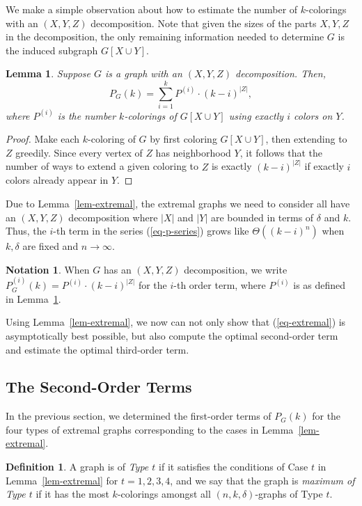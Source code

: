 \documentclass[11pt]{article}
\theoremstyle{plain}
\newtheorem{lemma}[theorem]{Lemma}
\theoremstyle{definition}
\newtheorem{definition}[theorem]{Definition}
\newtheorem*{notation}{Notation}
\theoremstyle{remark}
\begin{document}
We make a simple observation about how to estimate the number of $k$-colorings with an $(X,Y,Z)$ decomposition. Note that given the sizes of the parts $X,Y,Z$ in the decomposition, the only remaining information needed to determine $G$ is the induced subgraph $G[X \cup Y]$.

\begin{lemma}\label{lem-p-series}
Suppose $G$ is a graph with an $(X,Y,Z)$ decomposition. Then,
\begin{equation}\label{eq-p-series}
P_G(k) = \sum_{i=1}^{k} P^{(i)} \cdot (k-i)^{|Z|},
\end{equation}
where $P^{(i)}$ is the number $k$-colorings of $G[X\cup Y]$ using exactly $i$ colors on $Y$.
\end{lemma}
\begin{proof}
Make each $k$-coloring of $G$ by first coloring $G[X\cup Y]$, then extending to $Z$ greedily. Since every vertex of $Z$ has neighborhood $Y$, it follows that the number of ways to extend a given coloring to $Z$ is exactly $(k-i)^{|Z|}$ if exactly $i$ colors already appear in $Y$.
\end{proof}

Due to Lemma~\ref{lem-extremal}, the extremal graphs we need to consider all have an $(X,Y,Z)$ decomposition where $|X|$ and $|Y|$ are bounded in terms of $\delta$ and $k$. Thus, the $i$-th term in the series (\ref{eq-p-series}) grows like $\Theta((k-i)^n)$ when $k,\delta$ are fixed and $n\rightarrow \infty$. 

\begin{notation}
When $G$ has an $(X,Y,Z)$ decomposition, we write $P_G^{(i)}(k)=P^{(i)}\cdot (k-i)^{|Z|}$ for the $i$-th order term, where $P^{(i)}$ is as defined in Lemma~\ref{lem-p-series}.
\end{notation}

Using Lemma~\ref{lem-extremal}, we now can not only show that (\ref{eq-extremal}) is asymptotically best possible, but also compute the optimal second-order term and estimate the optimal third-order term. 


\subsection{The Second-Order Terms}
In the previous section, we determined the first-order terms of $P_G(k)$ for the four types of extremal graphs corresponding to the cases in Lemma~\ref{lem-extremal}.

\begin{definition}
A graph is of {\em Type $t$} if it satisfies the conditions of Case $t$ in Lemma~\ref{lem-extremal} for $t=1,2,3,4$, and we say that the graph is {\em maximum of Type $t$} if it has the most $k$-colorings amongst all $(n,k,\delta)$-graphs of Type $t$.
\end{definition}
\end{document}
